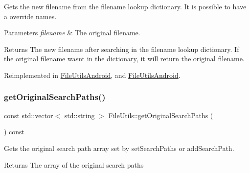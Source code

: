 Gets the new filename from the filename lookup dictionary. It is possible to have a override names. 
\begin{DoxyParams}{Parameters}
{\em filename} & The original filename. \\
\hline
\end{DoxyParams}
\begin{DoxyReturn}{Returns}
The new filename after searching in the filename lookup dictionary. If the original filename wasn\textquotesingle{}t in the dictionary, it will return the original filename. 
\end{DoxyReturn}


Reimplemented in \hyperlink{classFileUtilsAndroid_ac084c26eecd3e89ab708ccdab36ec3de}{File\+Utils\+Android}, and \hyperlink{classFileUtilsAndroid_a57440532823c7b9f5807457fef15b978}{File\+Utils\+Android}.

\mbox{\label{classFileUtils_a43670a0b6631730400ada9ca283bcc80}} 
\subsubsection{\texorpdfstring{get\+Original\+Search\+Paths()}{getOriginalSearchPaths()}}
{\footnotesize\ttfamily const std\+::vector$<$ std\+::string $>$ File\+Utils\+::get\+Original\+Search\+Paths (\begin{DoxyParamCaption}{ }\end{DoxyParamCaption}) const\hspace{0.3cm}{\ttfamily [virtual]}}

Gets the original search path array set by \textquotesingle{}set\+Search\+Paths\textquotesingle{} or \textquotesingle{}add\+Search\+Path\textquotesingle{}. \begin{DoxyReturn}{Returns}
The array of the original search paths 
\end{DoxyReturn}
\mbox{\label{classFileUtils_ae575880a693de746f1505be83c6b4bfa}} 
